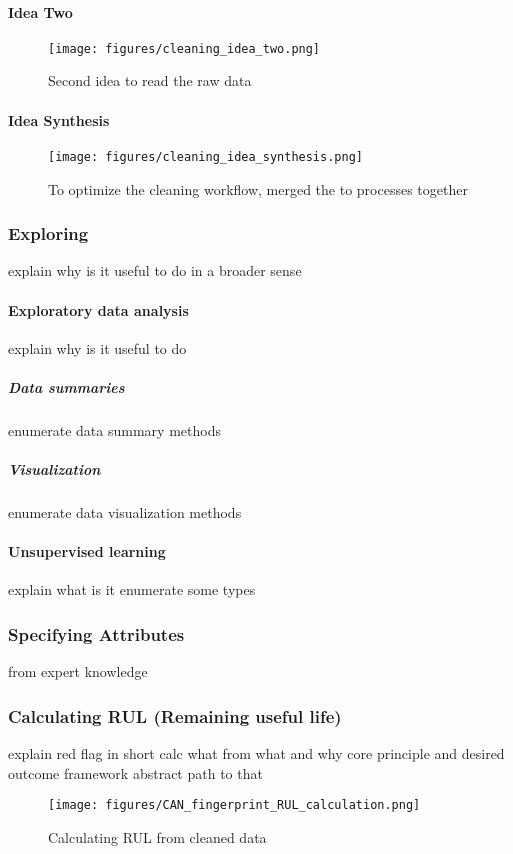 		\paragraph{Idea Two}
			\begin{figure}[!ht]
			\centering
			\texttt{[image: figures/cleaning\_idea\_two.png]}
			\caption{Second idea to read the raw data} 
			\end{figure}
		\paragraph{Idea Synthesis}
			\begin{figure}[!ht]
			\centering
			\texttt{[image: figures/cleaning\_idea\_synthesis.png]}
			\caption{To optimize the cleaning workflow, merged the to processes together} 
			\end{figure}
	\subsubsection{Exploring}
	explain why is it useful to do in a broader sense
		\paragraph{Exploratory data analysis}
			explain why is it useful to do
			\subparagraph{Data summaries}
			enumerate data summary methods
			\subparagraph{Visualization}
			enumerate data visualization methods
		\paragraph{Unsupervised learning}
		explain what is it 
		enumerate some types
	\subsubsection{Specifying Attributes}
	from expert knowledge
	\subsubsection{Calculating RUL (Remaining useful life)}
	explain red flag in short
	calc what from what and why core principle and desired outcome framework abstract path to that
		\begin{figure}[!ht]
		\centering
		\texttt{[image: figures/CAN\_fingerprint\_RUL\_calculation.png]}
		\caption{Calculating RUL from cleaned data} 
		\end{figure}	
